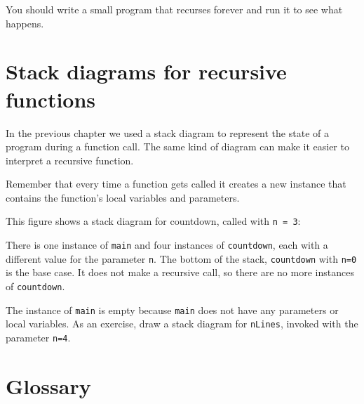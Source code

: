 You should write a small program that recurses forever and run
it to see what happens.

\section {Stack diagrams for recursive functions}

In the previous chapter we used a stack diagram to represent the
state of a program during a function call.  The same kind
of diagram can make it easier to interpret a recursive function.

Remember that every time a function gets called it creates
a new instance that contains
the function's local variables and parameters.

This figure shows a stack diagram for countdown, called
with {\tt n = 3}:

\vspace{0.1in}
\centerline{}
\vspace{0.1in}
%
There is one instance of {\tt main} and four instances of
{\tt countdown}, each with a different value for the parameter
{\tt n}.  The bottom of the stack, {\tt countdown} with {\tt n=0}
is the base case.  It does not make a recursive call, so there
are no more instances of {\tt countdown}.

The instance of {\tt main} is empty because {\tt main} does not
have any parameters or local variables.  As an exercise, draw a
stack diagram for {\tt nLines}, invoked with the parameter {\tt n=4}.


\section{Glossary}

